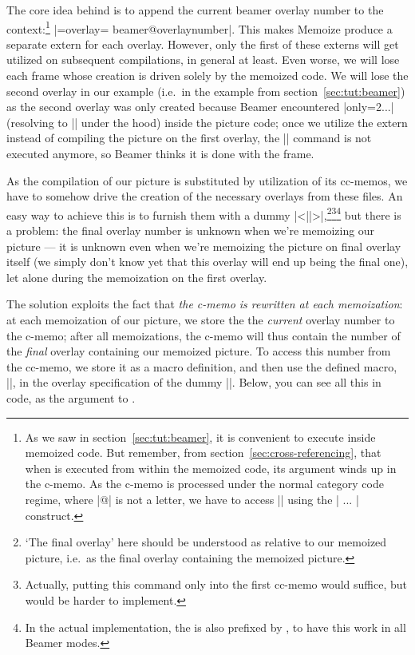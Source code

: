 \documentclass[a4paper,11pt]{article}
\begin{document}
The core idea behind  is to append the current beamer
overlay number to the context:\cprotect\footnote{As we saw in
  section~\ref{sec:tut:beamer}, it is convenient to execute  inside memoized code.  But remember, from
  section~\ref{sec:cross-referencing}, that when  is executed
  from within the memoized code, its argument winds up in the c-memo.  As the
  c-memo is processed under the normal category code regime, where |@| is not a
  letter, we have to access |\beamer@overlaynumber| using the |\csname
  ... \endcsname| construct.}  |={overlay=\csname
  beamer@overlaynumber\endcsname}|.  This makes Memoize produce a separate
extern for each overlay.  However, only the first of these externs will get
utilized on subsequent compilations, in general at least.  Even worse, we will
lose each frame whose creation is driven solely by the memoized code.  We will
lose the second overlay in our example (i.e.\ in the  example from
section~\ref{sec:tut:beamer}) as the second overlay was only created because
Beamer encountered |only={2}{...}| (resolving to || under the
hood) inside the picture code; once we utilize the extern instead of compiling
the picture on the first overlay, the |\only| command is not executed anymore,
so Beamer thinks it is done with the frame.

As the compilation of our picture is substituted by utilization of its
cc-memos, we have to somehow drive the creation of the necessary overlays from
these files.  An easy way to achieve this is to furnish them with a dummy
|\only<||>{}|,\footnote{`The final overlay' here
  should be understood as relative to our memoized picture, i.e.\ as the final
  overlay containing the memoized picture.}\footnote{Actually, putting this
   command only into the first cc-memo would suffice, but would be
  harder to implement.}\footnote{In the actual implementation, the  is also prefixed by , to have this work in all
  Beamer modes.}  but there is a problem: the final overlay number is unknown
when we're memoizing our picture --- it is unknown even when we're memoizing
the picture on final overlay itself (we simply don't know yet that this overlay
will end up being the final one), let alone during the memoization on the first
overlay.

The solution exploits the fact that \emph{the c-memo is rewritten at each
  memoization}: at each memoization of our picture, we store the the
\emph{current} overlay number to the c-memo; after all memoizations, the c-memo
will thus contain the number of the \emph{final} overlay containing our
memoized picture.  To access this number from the cc-memo, we store it as a
macro definition, and then use the defined macro, |\mmzBeamerOverlays|, in the
overlay specification of the dummy |\only|.  Below, you can see all this in
code, as the argument to .
\end{document}
